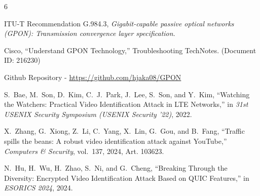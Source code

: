 \documentclass[conference]{IEEEtran}
\begin{document}







%
%
%
\FloatBarrier
\begin{thebibliography}{6}

ITU-T Recommendation G.984.3, \emph{Gigabit-capable passive optical networks (GPON): Transmission convergence layer specification}.


Cisco, ``Understand GPON Technology,'' Troubleshooting TechNotes. (Document ID: 216230)

Github Repository - \url{https://github.com/hjaka08/GPON}

S.~Bae, M.~Son, D.~Kim, C.~J.~Park, J.~Lee, S.~Son, and Y.~Kim,
``Watching the Watchers: Practical Video Identification Attack in LTE Networks,''
in \emph{31st USENIX Security Symposium (USENIX Security '22)}, 2022. 

X.~Zhang, G.~Xiong, Z.~Li, C.~Yang, X.~Lin, G.~Gou, and B.~Fang,
``Traffic spills the beans: A robust video identification attack against YouTube,''
\emph{Computers \& Security}, vol.~137, 2024, Art. 103623. 

N.~Hu, H.~Wu, H.~Zhao, S.~Ni, and G.~Cheng,
``Breaking Through the Diversity: Encrypted Video Identification Attack Based on QUIC Features,''
in \emph{ESORICS 2024}, 2024. 

\end{thebibliography}





\end{document}
